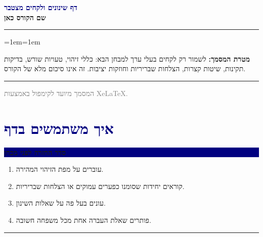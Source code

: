 \documentclass[12pt,a4paper]{article}
\newcommand{\en}[1]{\textenglish{#1}}
\newenvironment{contentunit}[1]{%
  \Needspace{0.27\textheight}%
  \par\medskip\noindent
  \begin{minipage}{\linewidth}
  \setlength{\parskip}{0.45em}%
  \colorbox{navy}{%
    \parbox{\dimexpr\linewidth-2\fboxsep\relax}{%
      \raggedleft\color{white}\bfseries #1%
    }%
  }%
  \par\vspace{0.45em}
}{%
  \par\vspace{0.2em}
  {\color{navy}\rule{\linewidth}{0.6pt}}%
  \end{minipage}
  \par\medskip
}
\newenvironment{noticebox}{%
  \Needspace{0.12\textheight}%
  \par\medskip\noindent
  \begin{minipage}{\linewidth}
  {\color{linegray}\rule{\linewidth}{0.6pt}}%
  \par\vspace{0.35em}
  \begingroup\leftskip=1em\rightskip=1em
}{%
  \par\endgroup\vspace{0.2em}
  {\color{linegray}\rule{\linewidth}{0.6pt}}%
  \end{minipage}
  \par\medskip
}
\begin{document}
\begin{RTL}

\thispagestyle{empty}
\vspace*{2.2cm}

\begin{center}
  {\fontsize{25}{30}\selectfont\bfseries\textcolor{navy}{דף שינונים ולקחים מצטבר}}\\[0.7em]
  {\Large \textbf{שם הקורס כאן}}\\[2.2em]

\end{center}

\vfill
\begin{noticebox}
\textbf{מטרת המסמך:} לשמור רק לקחים בעלי ערך למבחן הבא: כללי זיהוי, טעויות שורש, בדיקות תקינות, שיטות קצרות, הצלחות שבריריות וחוזקות יציבות. זה אינו סיכום מלא של הקורס.
\end{noticebox}
\vfill

\begin{center}
\small\textcolor{graytext}{המסמך מיועד לקימפול באמצעות \en{XeLaTeX}.}
\end{center}

\clearpage
\tableofcontents
\clearpage

\section*{\textcolor{navy}{איך משתמשים בדף}}

\begin{contentunit}{סדר החזרה לפני מבחן}
\begin{enumerate}
  \item עוברים על מפת הזיהוי המהירה.
  \item קוראים יחידות שסומנו כפערים עמוקים או הצלחות שבריריות.
  \item עונים בעל פה על שאלות השינון.
  \item פותרים שאלת העברה אחת מכל משפחה חשובה.
\end{enumerate}
\end{contentunit}


\end{RTL}
\end{document}

